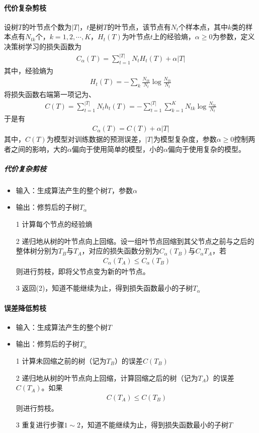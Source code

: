 \paragraph{代价复杂剪枝}设树$T$的叶节点个数为$|T|$，$t$是树$T$的叶节点，该节点有$N_t$个样本点，其中$k$类的样本点有$N_{tk}$个，$k=1,2,\cdots,K$，$H_t(T)$为叶节点$t$上的经验熵，$\alpha\geq 0$为参数，定义决策树学习的损失函数为
\begin{eqnarray}
C_\alpha(T)=\sum_{t=1}^{|T|} N_tH_t(T)+\alpha|T|
\end{eqnarray}
其中，经验熵为
\begin{eqnarray}
H_t(T)=-\sum_k\frac{N_{tk}}{N_t}\log\frac{N_{tk}}{N_t}
\end{eqnarray}
将损失函数右端第一项记为、
\begin{eqnarray}
C(T)=\sum_{t=1}^{|T|} N_th_t(T)=-\sum_{t=1}^{|T|}\sum_{k=1}^K N_{tk}\log\frac{N_{tk}}{N_t}
\end{eqnarray}
于是有
\begin{eqnarray}
C_\alpha(T)=C(T)+\alpha|T|
\end{eqnarray}
其中，$C(T)$为模型对训练数据的预测误差，$|T|$为模型复杂度，参数$\alpha\geq	 0$控制两者之间的影响，大的$\alpha$偏向于使用简单的模型，小的$\alpha$偏向于使用复杂的模型。
\subparagraph{代价复杂剪枝}
\begin{itemize}
\item 输入：生成算法产生的整个树$T$，参数$\alpha$
\item 输出：修剪后的子树$T_\alpha$
\item[1] 计算每个节点的经验熵
\item[2] 递归地从树的叶节点向上回缩。设一组叶节点回缩到其父节点之前与之后的整体树分别为$T_B$与$T_A$，对应的损失函数分别为$C_\alpha(T_B)$与$C_\alpha{T_A}$，若
\begin{eqnarray}
C_\alpha(T_A)\leq C_\alpha(T_B)
\end{eqnarray}
则进行剪枝，即将父节点变为新的叶节点。
\item[3] 返回(2)，知道不能继续为止，得到损失函数最小的子树$T_\alpha$
\end{itemize}
\paragraph{误差降低剪枝}
\begin{itemize}
\item 输入：生成算法产生的整个树$T$
\item 输出：修剪后的子树$T_\alpha$
\item[1] 计算未回缩之前的树（记为$T_B$）的误差$C(T_B)$
\item[2] 递归地从树的叶节点向上回缩，计算回缩之后的树（记为$T_A$）的误差$C(T_A)$。如果
\begin{eqnarray}
C(T_A)\leq C(T_B)
\end{eqnarray}
则进行剪枝。
\item[3] 重复进行步骤$1\sim 2$，知道不能继续为止，得到损失函数最小的子树$T$
\end{itemize}

